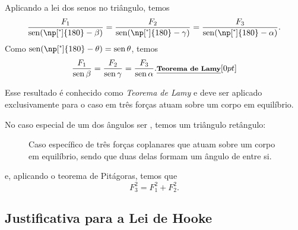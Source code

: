 \noindent{}Aplicando a lei dos senos no triângulo, temos
\begin{equation}
    \frac{F_1}{\sen (\np[\tcdegree]{180} - \beta)} = \frac{F_2}{\sen (\np[\tcdegree]{180} - \gamma)} = \frac{F_3}{\sen (\np[\tcdegree]{180} - \alpha)}.
\end{equation}
%
Como $\sen (\np[\tcdegree]{180} - \theta) = \sen\theta$, temos
\begin{equation}
    \frac{F_1}{\operatorname{sen} \beta} = \frac{F_2}{\operatorname{sen} \gamma} = \frac{F_3}{\operatorname{sen} \alpha}. \relax{\footnotesize\emph{\textbf{Teorema de Lamy}}}[0pt]
\end{equation}

\noindent{}Esse resultado é conhecido como \emph{Teorema de Lamy} e deve ser aplicado exclusivamente para o caso em três forças atuam sobre um corpo em equilíbrio.

No caso especial de um dos ângulos ser , temos um triângulo retângulo:
\begin{figure}[!h]
\centering
{}
\caption{Caso específico de três forças coplanares que atuam sobre um corpo em equilíbrio, sendo que duas delas formam um ângulo de  entre si.\label{Fig:LamyTrianguloRetangulo}}
\end{figure}

\noindent{}e, aplicando o teorema de Pitágoras, temos que
\begin{equation}
    F_3^2 = F_1^2 + F_2^2.
\end{equation}


\subsection{Justificativa para a Lei de Hooke}

